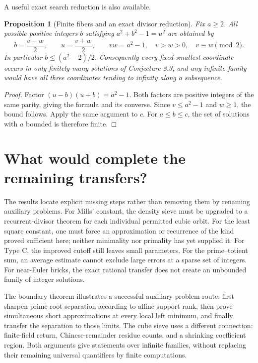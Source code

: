 \documentclass[11pt,a4paper]{article}
\newtheorem{proposition}[theorem]{Proposition}
\theoremstyle{definition}
\theoremstyle{remark}
\numberwithin{equation}{section}
\begin{document}
A useful exact search reduction is also available.

\begin{proposition}[Finite fibers and an exact divisor reduction]
Fix $a\geq2$. All possible positive integers $b$ satisfying
$a^2+b^2-1=u^2$ are obtained by
\[
 b=\frac{v-w}{2},\qquad u=\frac{v+w}{2},\qquad
 vw=a^2-1,\quad v>w>0,\quad v\equiv w\pmod2.
\]
In particular $b\leq(a^2-2)/2$. Consequently every fixed smallest
coordinate occurs in only finitely many solutions of Conjecture 8.3,
and any infinite family would have all three coordinates tending to
infinity along a subsequence.
\end{proposition}

\begin{proof}
Factor $(u-b)(u+b)=a^2-1$. Both factors are positive integers of the
same parity, giving the formula and its converse. Since $v\leq a^2-1$
and $w\geq1$, the bound follows. Apply the same argument to $c$.
For $a\leq b\leq c$, the set of solutions with $a$ bounded is therefore
finite.
\end{proof}

\section{What would complete the remaining transfers?}
The results locate explicit missing steps rather than removing them by
renaming auxiliary problems. For Mills' constant, the density sieve must
be upgraded to a recurrent-divisor theorem for each individual permitted
cubic orbit. For the least square constant, one must force an
approximation or recurrence of the kind proved sufficient here; neither
minimality nor primality has yet supplied it. For Type C, the improved
cutoff still leaves small parameters. For the prime--totient sum, an
average estimate cannot exclude large errors at a sparse set of integers.
For near-Euler bricks, the exact rational transfer does not create an
unbounded family of integer solutions.

The boundary theorem illustrates a successful auxiliary-problem route:
first sharpen prime-root separation according to affine support rank,
then prove simultaneous short approximations at every local left minimum,
and finally transfer the separation to those limits. The cube sieve uses
a different connection: finite-field return, Chinese-remainder residue
counts, and a shrinking coefficient region. Both arguments give statements
over infinite families, without replacing their remaining universal
quantifiers by finite computations.
\end{document}
